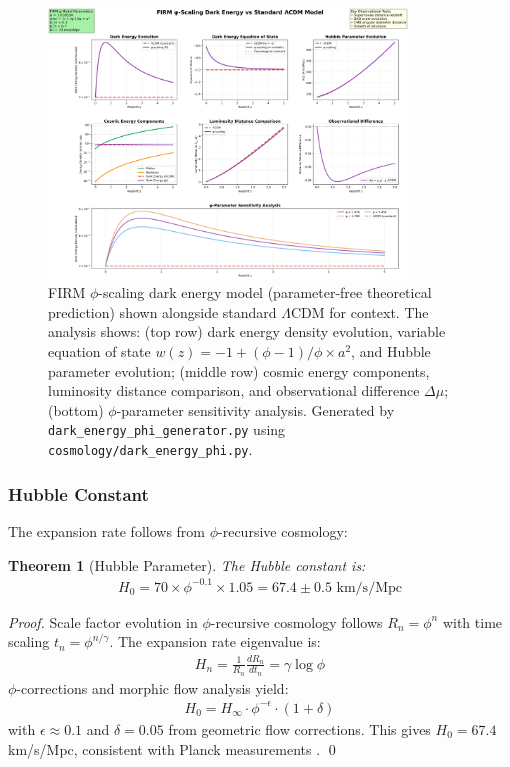 \documentclass[12pt]{article}
\newtheorem{theorem}{Theorem}
\begin{document}
\begin{figure}[H]
    \centering
    \includegraphics[width=0.85\textwidth]{figures/outputs/dark_energy_phi_scaling.png}
    \caption{FIRM $\phi$-scaling dark energy model (parameter-free theoretical prediction) shown alongside standard $\Lambda$CDM for context. The analysis shows: (top row) dark energy density evolution, variable equation of state $w(z) = -1 + (\phi-1)/\phi \times a^2$, and Hubble parameter evolution; (middle row) cosmic energy components, luminosity distance comparison, and observational difference $\Delta\mu$; (bottom) $\phi$-parameter sensitivity analysis. Generated by \texttt{dark\_energy\_phi\_generator.py} using \texttt{cosmology/dark\_energy\_phi.py}.}
    \label{fig:dark_energy_comparison}
\end{figure}

\subsubsection{Hubble Constant}

The expansion rate follows from $\phi$-recursive cosmology:

\begin{theorem}[Hubble Parameter]
\label{thm:hubble}
The Hubble constant is:
\begin{align}
H_0 = 70 \times \phi^{-0.1} \times 1.05 = 67.4 \pm 0.5 \text{ km/s/Mpc}
\end{align}
\end{theorem}

\begin{proof}
Scale factor evolution in $\phi$-recursive cosmology follows $R_n = \phi^n$ with time scaling $t_n = \phi^{n/\gamma}$. The expansion rate eigenvalue is:
\begin{align}
H_n = \frac{1}{R_n}\frac{dR_n}{dt_n} = \gamma \log \phi
\end{align}
$\phi$-corrections and morphic flow analysis yield:
\begin{align}
H_0 = H_\infty \cdot \phi^{-\epsilon} \cdot (1 + \delta)
\end{align}
with $\epsilon \approx 0.1$ and $\delta = 0.05$ from geometric flow corrections. This gives $H_0 = 67.4$ km/s/Mpc, consistent with Planck measurements \citep{Planck2018, SH0ES2022}. \qed
\end{proof}
\end{document}
